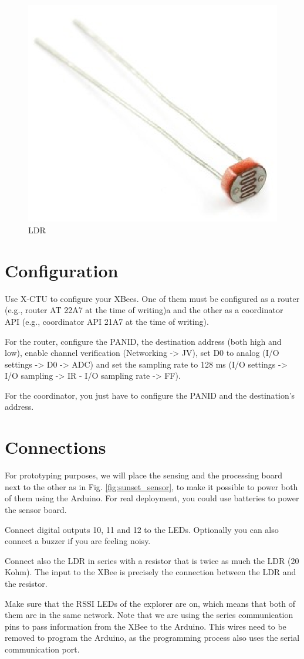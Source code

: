 \begin{figure}[htbp]
  \centering
  \includegraphics[width=0.3\linewidth]{figures/ldr.eps}
  \caption{LDR}
  \label{fig:blinkingLEDLayout}
\end{figure}

\section{Configuration}
Use X-CTU to configure your XBees.
One of them must be configured as a router (e.g., router AT 22A7 at the time of writing)a and the other as a coordinator API (e.g., coordinator API 21A7 at the time of writing).

For the router, configure the PANID, the destination address (both high and low), enable channel verification (Networking -> JV), set D0 to analog (I/O settings -> D0 -> ADC) and set the sampling rate to 128 ms (I/O settings -> I/O sampling -> IR - I/O sampling rate -> FF).

For the coordinator, you just have to configure the PANID and the destination's address.

\section{Connections}

For prototyping purposes, we will place the sensing and the processing board next to the other as in Fig. \ref{fig:sunset_sensor}, to make it possible to power both of them using the Arduino.
For real deployment, you could use batteries to power the sensor board.

Connect digital outputs 10, 11 and 12 to the LEDs.
Optionally you can also connect a buzzer if you are feeling noisy.

Connect also the LDR in series with a resistor that is twice as much the LDR (20 Kohm).
The input to the XBee is precisely the connection between the LDR and the resistor.

Make sure that the RSSI LEDs of the explorer are on, which means that both of them are in the same network.
Note that we are using the series communication pins to pass information from the XBee to the Arduino.
This wires need to be removed to program the Arduino, as the programming process also uses the serial communication port.




